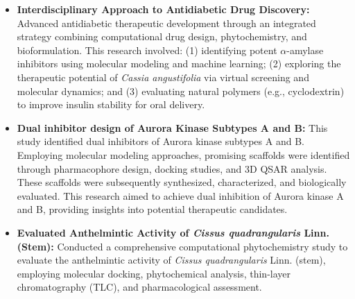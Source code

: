 \documentclass[10pt,a4paper,ragged2e,withhyper]{altacv}
\begin{document}
\begin{itemize}
\item \textbf{Interdisciplinary Approach to Antidiabetic Drug Discovery:} Advanced antidiabetic therapeutic development through an integrated strategy combining computational drug design, phytochemistry, and bioformulation. This research involved: (1) identifying potent $\alpha$-amylase inhibitors using molecular modeling and machine learning; (2) exploring the therapeutic potential of \textit{Cassia angustifolia} via virtual screening and molecular dynamics; and (3) evaluating natural polymers (e.g., cyclodextrin) to improve insulin stability for oral delivery. 
\end{itemize}
\begin{itemize}
\item \textbf{Dual inhibitor design of Aurora Kinase Subtypes A and B:}
This study identified dual inhibitors of Aurora kinase subtypes A and B. Employing molecular modeling approaches, promising scaffolds were identified through pharmacophore design, docking studies, and 3D QSAR analysis. These scaffolds were subsequently synthesized, characterized, and biologically evaluated. This research aimed to achieve dual inhibition of Aurora kinase A and B, providing insights into potential therapeutic candidates.
\end{itemize}
\begin{itemize}
\item \textbf{Evaluated Anthelmintic Activity of \textit{Cissus quadrangularis} Linn. (Stem):} Conducted a comprehensive computational phytochemistry study to evaluate the anthelmintic activity of \textit{Cissus quadrangularis} Linn. (stem), employing molecular docking, phytochemical analysis, thin-layer chromatography (TLC), and pharmacological assessment.
\end{itemize}
\end{document}
